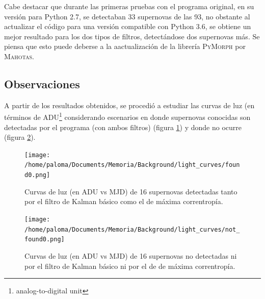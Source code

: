 Cabe destacar que durante las primeras pruebas con el programa original, en su versi\'on para Python 2.7, se detectaban 33 supernovas de las 93, no obstante al actualizar el c\'odigo para una versi\'on compatible con Python 3.6, se obtiene un mejor resultado para los dos tipos de filtros, detect\'andose dos supernovas m\'as. Se piensa que esto puede deberse a la aactualizaci\'on de la librer\'ia \textsc{PyMorph} por \textsc{Mahotas}. 

\bigskip

\subsection{Observaciones}
A partir de los resultados obtenidos, se procedi\'o a estudiar las curvas de luz (en t\'erminos de ADU\footnote{analog-to-digital unit} considerando escenarios en donde supernovas conocidas son detectadas por el programa (con ambos filtros) (figura \ref{fig:sns_found}) y donde no ocurre (figura \ref{fig:sns_not_found}). 

\begin{figure}[h!]
\centering
\texttt{[image: /home/paloma/Documents/Memoria/Background/light\_curves/found0.png]}
\caption{Curvas de luz (en ADU vs MJD) de 16 supernovas detectadas tanto por el filtro de Kalman b\'asico como el de m\'axima correntrop\'ia.}
\label{fig:sns_found}
\end{figure}

\begin{figure}[h!]
\centering
\texttt{[image: /home/paloma/Documents/Memoria/Background/light\_curves/not\_found0.png]}
\caption{Curvas de luz (en ADU vs MJD) de 16 supernovas no detectadas ni por el filtro de Kalman b\'asico ni por el de de m\'axima correntrop\'ia.}
\label{fig:sns_not_found}
\end{figure}

